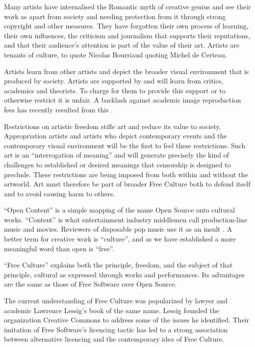 \documentclass[11pt, a4]{article}
\let\footnote=\endnote
\begin{document}
Many artists have internalised the Romantic myth of creative genius and see their work as apart from society and needing protection from it through strong copyright and other measures. They have forgotten their own process of learning, their own influences, the criticism and journalism that supports their reputations, and that their audience's attention is part of the value of their art. Artists are tenants of culture, to quote Nicolas Bourriaud quoting Michel de Certeau\cite{Bourriaud2002}.

Artists learn from other artists and depict the broader visual environment that is produced by society. Artists are supported by and will learn from critics, academics and theorists. To charge for them to provide this support or to otherwise restrict it is unfair. A backlash against academic image reproduction fees has recently resulted from this \cite{BAJ2007}. 

Restrictions on artistic freedom stifle art and reduce its value to society. Appropriation artists and artists who depict contemporary events and the contemporary visual environment will be the first to feel these restrictions. Such art is an ``interrogation of meaning''\cite{Miller2004} and will generate precisely the kind of challenges to established or desired meanings that censorship is designed to preclude. These restrictions are being imposed from both within and without the artworld. Art must therefore be part of broader Free Culture both to defend itself and to avoid causing harm to others.

``Open Content'' is a simple mapping of the name Open Source onto cultural works. ``Content'' is what entertainment industry middlemen call production-line music and movies. Reviewers of disposable pop music use it as an insult \cite{Brooker2006}. A better term for creative work is ``culture'', and as we have established a more meaningful word than open is ``free''.

``Free Culture'' explains both the principle, freedom, and the subject of that principle, cultural as expressed through works and performances. Its advantages are the same as those of Free Software over Open Source.

The current understanding of Free Culture was popularized by lawyer and academic Lawrence Lessig's book of the same name\cite{Lessig2004}. Lessig founded the organization Creative Commons to address some of the issues he identified\footnote{See: \url{http://www.creativecommons.org/}}. Their imitation of Free Software's licencing tactic has led to a strong association between alternative licencing and the contemporary idea of Free Culture. 
\end{document}
